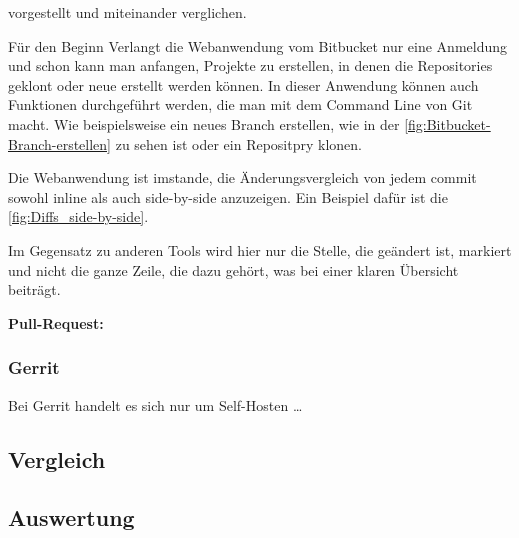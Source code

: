 vorgestellt und miteinander verglichen.


Für den Beginn Verlangt die Webanwendung vom Bitbucket nur eine Anmeldung und schon kann man anfangen, Projekte zu erstellen, in denen die Repositories geklont oder neue erstellt werden können. In dieser Anwendung können auch Funktionen durchgeführt werden, die man mit dem Command Line von Git macht. Wie beispielsweise ein neues Branch erstellen, wie in der \cref{fig:Bitbucket-Branch-erstellen} zu sehen ist oder ein Repositpry klonen.


Die Webanwendung ist imstande, die Änderungsvergleich von jedem commit sowohl inline als auch side-by-side anzuzeigen. Ein Beispiel dafür ist die \cref{fig:Diffs_side-by-side}.


Im Gegensatz zu anderen Tools wird hier nur die Stelle, die geändert ist, markiert und nicht die ganze Zeile, die dazu gehört, was bei einer klaren Übersicht beiträgt.

\textbf{Pull-Request:} 


\subsubsection{Gerrit}
\label{subsubsec:Test_Gerrit}

Bei Gerrit handelt es sich nur um Self-Hosten \dots

\subsection{Vergleich}
\label{subsec:Vergleich_Bitbucket_Gerrit}


\subsection{Auswertung}
\label{subsec:Auswertung}
